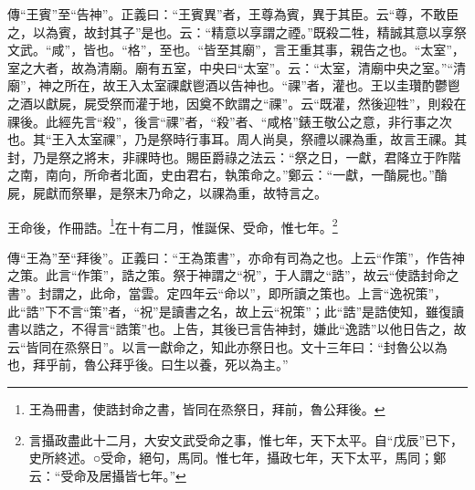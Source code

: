 {\noindent\zhuan{}\fzbyks 傳“王賓”至“告神”。正義曰：“王賓異”者，王尊為賓，異于其臣。云“尊，不敢臣之，以為賓，故封其子”是也。云：“精意以享謂之禋。”既殺二牲，精誠其意以享祭文武。“咸”，皆也。“格”，至也。“皆至其廟”，言王重其事，親告之也。“太室”，室之大者，故為清廟。廟有五室，中央曰“太室”。云：“太室，清廟中央之室。”“清廟”，神之所在，故王入太室祼獻鬯酒以告神也。“祼”者，灌也。王以圭瓚酌鬱鬯之酒以獻屍，屍受祭而灌于地，因奠不飲謂之“祼”。云“既灌，然後迎牲”，則殺在祼後。此經先言“殺”，後言“祼”者，“殺”者、“咸格”錶王敬公之意，非行事之次也。其“王入太室祼”，乃是祭時行事耳。周人尚臭，祭禮以祼為重，故言王祼。其封，乃是祭之將末，非祼時也。賜臣爵祿之法云：“祭之日，一獻，君降立于阼階之南，南向，所命者北面，史由君右，執策命之。”鄭云：“一獻，一酳屍也。”酳屍，屍獻而祭畢，是祭末乃命之，以祼為重，故特言之。 \par}

王命後，作冊誥。\footnote{王為冊書，使誥封命之書，皆同在烝祭日，拜前，魯公拜後。}在十有二月，惟誕保、受命，惟七年。\footnote{言攝政盡此十二月，大安文武受命之事，惟七年，天下太平。自“戊辰”已下，史所終述。○受命，絕句，馬同。惟七年，攝政七年，天下太平，馬同；鄭云：“受命及居攝皆七年。”}

{\noindent\zhuan{}\fzbyks 傳“王為”至“拜後”。正義曰：“王為策書”，亦命有司為之也。上云“作策”，作告神之策。此言“作策”，誥之策。祭于神謂之“祝”，于人謂之“誥”，故云“使誥封命之書”。封謂之，此命，當雲。定四年云“命以”，即所讀之策也。上言“逸祝策”，此“誥”下不言“策”者，“祝”是讀書之名，故上云“祝策”；此“誥”是誥使知，雖復讀書以誥之，不得言“誥策”也。上告，其後已言告神封，嫌此“逸誥”以他日告之，故云“皆同在烝祭日”。以言一獻命之，知此亦祭日也。文十三年曰：“封魯公以為也，拜乎前，魯公拜乎後。曰生以養，死以為主。” \par}


